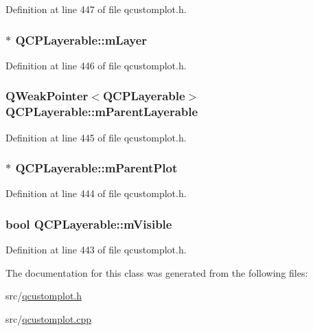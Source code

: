 Definition at line 447 of file qcustomplot.\-h.

\hypertarget{class_q_c_p_layerable_aa38ec5891aff0f50b36fd63e9372a0cd}{
\subsubsection[{m\-Layer}]{$\ast$ Q\-C\-P\-Layerable\-::m\-Layer\hspace{0.3cm}{\ttfamily [protected]}}}\label{class_q_c_p_layerable_aa38ec5891aff0f50b36fd63e9372a0cd}


Definition at line 446 of file qcustomplot.\-h.

\hypertarget{class_q_c_p_layerable_a17dbb64129b2c3a37c79378b619ebce4}{
\subsubsection[{m\-Parent\-Layerable}]{\setlength{\rightskip}{0pt plus 5cm}Q\-Weak\-Pointer$<${\bf Q\-C\-P\-Layerable}$>$ Q\-C\-P\-Layerable\-::m\-Parent\-Layerable\hspace{0.3cm}{\ttfamily [protected]}}}\label{class_q_c_p_layerable_a17dbb64129b2c3a37c79378b619ebce4}


Definition at line 445 of file qcustomplot.\-h.

\hypertarget{class_q_c_p_layerable_aa2a528433e44db02b8aef23c1f9f90ed}{
\subsubsection[{m\-Parent\-Plot}]{$\ast$ Q\-C\-P\-Layerable\-::m\-Parent\-Plot\hspace{0.3cm}{\ttfamily [protected]}}}\label{class_q_c_p_layerable_aa2a528433e44db02b8aef23c1f9f90ed}


Definition at line 444 of file qcustomplot.\-h.

\hypertarget{class_q_c_p_layerable_a62e3aed8427d6ce3ccf716f285106cb3}{
\subsubsection[{m\-Visible}]{\setlength{\rightskip}{0pt plus 5cm}bool Q\-C\-P\-Layerable\-::m\-Visible\hspace{0.3cm}{\ttfamily [protected]}}}\label{class_q_c_p_layerable_a62e3aed8427d6ce3ccf716f285106cb3}


Definition at line 443 of file qcustomplot.\-h.



The documentation for this class was generated from the following files\-:\begin{DoxyCompactItemize}
\item 
src/\hyperlink{qcustomplot_8h}{qcustomplot.\-h}\item 
src/\hyperlink{qcustomplot_8cpp}{qcustomplot.\-cpp}\end{DoxyCompactItemize}
